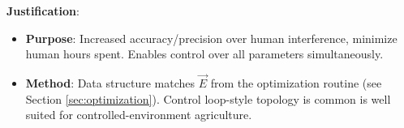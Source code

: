 \documentclass{report}
\begin{document}
\textbf{Justification}: 
\begin{itemize}
    \item \textbf{Purpose}: Increased accuracy/precision over human interference, minimize human hours spent. Enables control over all parameters simultaneously.
    \item \textbf{Method}: Data structure matches $\vec E$ from the optimization routine (see Section \ref{sec:optimization}). Control loop-style topology is common is well suited for controlled-environment agriculture.
\end{itemize}










\end{document}
